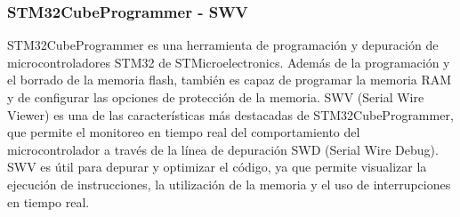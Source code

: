 \subsubsection{STM32CubeProgrammer - SWV}

STM32CubeProgrammer es una herramienta de programación y depuración de microcontroladores STM32 de STMicroelectronics. Además de la programación y el borrado de la memoria flash, también es capaz de programar la memoria RAM y de configurar las opciones de protección de la memoria. SWV (Serial Wire Viewer) es una de las características más destacadas de STM32CubeProgrammer, que permite el monitoreo en tiempo real del comportamiento del microcontrolador a través de la línea de depuración SWD (Serial Wire Debug). SWV es útil para depurar y optimizar el código, ya que permite visualizar la ejecución de instrucciones, la utilización de la memoria y el uso de interrupciones en tiempo real.



